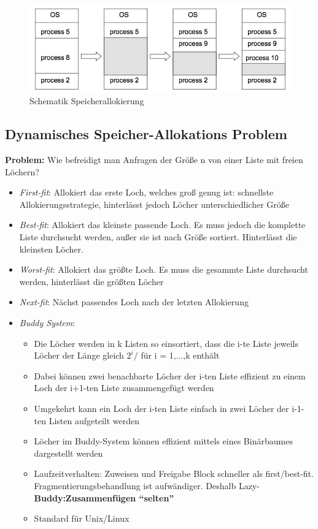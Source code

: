 \documentclass[a4paper]{scrreprt}
\begin{document}
\begin{figure}[ht]
\centering
\includegraphics[scale=0.6]{allocation.png}
\caption{Schematik Speicherallokierung}
\end{figure}

\subsection{Dynamisches Speicher-Allokations Problem}
\textbf{Problem:} Wie befreidigt man Anfragen der Größe n von einer Liste mit freien Löchern?
\begin{itemize}
\item \textit{First-fit}: Allokiert das erste Loch, welches groß genug ist: schnellste Allokierungsstrategie, hinterlässt jedoch Löcher unterschiedlicher Größe
\item \textit{Best-fit}: Allokiert das kleinste passende Loch. Es muss jedoch die komplette Liste durchsucht werden, außer sie ist nach Größe sortiert. Hinterlässt die kleinsten Löcher.
\item \textit{Worst-fit}: Allokiert das größte Loch. Es muss die gesammte Liste durchsucht werden, hinterlässt die größten Löcher
\item \textit{Next-fit}: Nächst passendes Loch nach der letzten Allokierung
\item \textit{Buddy System}:
\begin{itemize}
\item Die Löcher werden in k Listen so einsortiert, dass die i-te Liste jeweils Löcher der Länge gleich $2^i/$ für i = 1,...,k enthält
\item Dabei können zwei benachbarte Löcher der i-ten Liste effizient zu einem  Loch der i+1-ten Liste zusammengefügt werden
\item Umgekehrt kann ein Loch der i-ten Liste einfach in zwei Löcher der i-1-ten Listen aufgeteilt werden
\item Löcher im Buddy-System können effizient mittels eines Binärbaumes dargestellt werden
\item Laufzeitverhalten: Zuweisen und Freigabe Block schneller als first/best-fit. Fragmentierungsbehandlung ist aufwändiger. Deshalb Lazy-\textbf{Buddy:Zusammenfügen "`selten"'}
\item Standard für Unix/Linux
\end{itemize}
\end{itemize}
\end{document}
